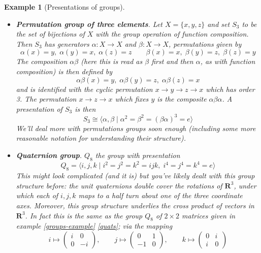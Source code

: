\documentclass[12pt]{article}
\numberwithin{equation}{subsection}
\theoremstyle{note}
\newtheorem{example}[subsection]{Example}
\begin{document}
\begin{example}[Presentations of groups]
\begin{itemize}
	\item \textbf{Permutation group of three elements}. Let $X=\{x,y,z\}$ and set $S_3$ to be the set of bijections of $X$ with the group operation of function composition. Then $S_3$ has generators $\alpha\colon X\to X$ and $\beta \colon X\to X$, permutations given by \[ \alpha(x)=y,\; \alpha(y)=x,\;\alpha(z)=z \qquad \beta(x)=x,\; \beta(y)=z,\; \beta(z)=y\] The composition $\alpha \beta$ (here this is read as $\beta$ first and then $\alpha$, as with function composition) is then defined by \[\alpha\beta(x)=y,\; \alpha\beta(y)=z,\; \alpha\beta(z)=x\] and is identified with the cyclic permutation $x\to y\to z\to x$ which has order 3. The permutation $x\to z\to x$ which fixes $y$ is the composite $\alpha\beta\alpha$.
	A presentation of $S_3$ is then \begin{equation}S_3\cong \langle \alpha,\beta \mid \alpha^2=\beta^2=(\beta\alpha)^3=e\rangle\end{equation}
	We'll deal more with permutations groups soon enough (including some more reasonable notation for understanding their structure).
	\item \textbf{Quaternion group}. $Q_8$ the group with presentation \begin{equation} \label{Q_8} Q_8=\langle i,j,k \mid i^2=j^2=k^2=ijk, \;i^4=j^4=k^4=e\rangle\end{equation}
	This might look complicated (and it is) but you've likely dealt with this group structure before: the unit quaternions double cover the rotations of $\mathbf{R}^3$, under which each of $i,j,k$ maps to a half turn about one of the three coordinate axes. Moreover, this group structure underlies the \textit{cross product} of vectors in $\mathbf{R}^3$. In fact this is the same as the group $Q_8$ of $2\times 2$ matrices given in example \ref{groups-example} \ref{quats}; via the mapping \[i\mapsto \begin{pmatrix} i & 0 \\ 0 & -i \end{pmatrix}, \qquad j\mapsto \begin{pmatrix} 0 & 1 \\ -1 & 0\end{pmatrix}, \qquad k\mapsto \begin{pmatrix} 0 & i \\ i & 0 \end{pmatrix}\]
	
\end{itemize}
\end{example}
\end{document}
